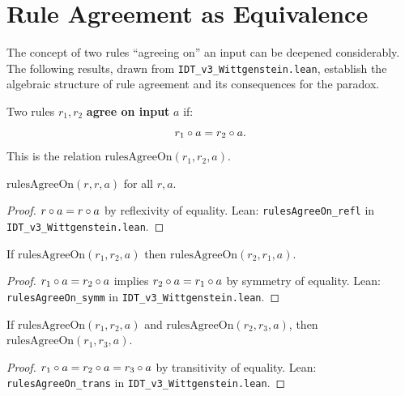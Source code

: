 \section{Rule Agreement as Equivalence}

The concept of two rules ``agreeing on'' an input can be deepened considerably.
The following results, drawn from \texttt{IDT\_v3\_Wittgenstein.lean}, establish
the algebraic structure of rule agreement and its consequences for the paradox.

\begin{definition}
\label{def:rules-agree-on}
Two rules $r_1, r_2$ \textbf{agree on input} $a$ if:
\[
r_1 \circ a = r_2 \circ a.
\]
This is the relation $\mathrm{rulesAgreeOn}(r_1, r_2, a)$.
\end{definition}

\begin{theorem}
\label{thm:rule-agree-refl}
$\mathrm{rulesAgreeOn}(r, r, a)$ for all $r, a$.
\end{theorem}

\begin{proof}
$r \circ a = r \circ a$ by reflexivity of equality.
Lean: \texttt{rulesAgreeOn\_refl} in \texttt{IDT\_v3\_Wittgenstein.lean}.
\end{proof}

\begin{theorem}
\label{thm:rule-agree-sym}
If $\mathrm{rulesAgreeOn}(r_1, r_2, a)$ then $\mathrm{rulesAgreeOn}(r_2, r_1, a)$.
\end{theorem}

\begin{proof}
$r_1 \circ a = r_2 \circ a$ implies $r_2 \circ a = r_1 \circ a$
by symmetry of equality.
Lean: \texttt{rulesAgreeOn\_symm} in \texttt{IDT\_v3\_Wittgenstein.lean}.
\end{proof}

\begin{theorem}
\label{thm:rule-agree-trans}
If $\mathrm{rulesAgreeOn}(r_1, r_2, a)$ and $\mathrm{rulesAgreeOn}(r_2, r_3, a)$,
then $\mathrm{rulesAgreeOn}(r_1, r_3, a)$.
\end{theorem}

\begin{proof}
$r_1 \circ a = r_2 \circ a = r_3 \circ a$ by transitivity of equality.
Lean: \texttt{rulesAgreeOn\_trans} in \texttt{IDT\_v3\_Wittgenstein.lean}.
\end{proof}

